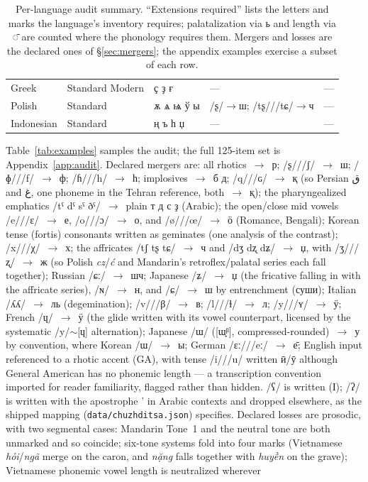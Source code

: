 \documentclass[12pt]{article}
\newcommand{\cz}[1]{{\chu #1}}
\newcommand{\ph}[1]{{\ipafont/#1/}}
\begin{document}
\begin{table}[ht]
\begin{tabular}{lllll}
Greek & Standard Modern & \cz{ҫ ҙ ғ} & — & — \\
Polish & Standard & \cz{ѫ ѧ ѩ ў ы} & \ph{ʂ}$\rightarrow$\cz{ш}; \ph{tʂ}/\ph{tɕ}$\rightarrow$\cz{ч} & — \\
Indonesian & Standard & \cz{ң ъ һ џ} & — & — \\
\bottomrule
\end{tabular}
\caption{Per-language audit summary. ``Extensions required'' lists the letters and marks the language's inventory requires; palatalization via \cz{ь} and length via \cz{◌̄} are counted where the phonology requires them. Mergers and losses are the declared ones of \S\ref{sec:mergers}; the appendix examples exercise a subset of each row.}
\label{tab:audit}
\end{table}
 Table~\ref{tab:examples} samples the audit; the full 125-item set is Appendix~\ref{app:audit}. Declared mergers\label{sec:mergers} are: all rhotics~$\rightarrow$~\cz{р}; \ph{ʂ}/\ph{ʃ}~$\rightarrow$~\cz{ш}; \ph{ɸ}/\ph{f}~$\rightarrow$~\cz{ф}; \ph{ɦ}/\ph{h}~$\rightarrow$~\cz{һ}; implosives~$\rightarrow$~\cz{б д}; \ph{q}/\ph{ɢ}~$\rightarrow$~\cz{қ} (so Persian {\ipafont ق} and {\ipafont غ}, one phoneme in the Tehran reference, both~$\rightarrow$~\cz{қ}); the pharyngealized emphatics \ph{tˤ dˤ sˤ ðˤ}~$\rightarrow$~plain \cz{т д с ҙ} (Arabic); the open/close mid vowels \ph{e}/\ph{ɛ}~$\rightarrow$~\cz{е}, \ph{o}/\ph{ɔ}~$\rightarrow$~\cz{о}, and \ph{ø}/\ph{œ}~$\rightarrow$~\cz{ӧ} (Romance, Bengali); Korean tense (fortis) consonants written as geminates (one analysis of the contrast); \ph{x}/\ph{χ}~$\rightarrow$~\cz{х}; the affricates \ph{tʃ tʂ tɕ}~$\rightarrow$~\cz{ч} and \ph{dʒ dʐ dʑ}~$\rightarrow$~\cz{џ}, with \ph{ʒ}/\ph{ʐ}~$\rightarrow$~\cz{ж} (so Polish \emph{cz}/\emph{ć} and Mandarin's retroflex/palatal series each fall together); Russian \ph{ɕː}~$\rightarrow$~\cz{шч}; Japanese \ph{ʑ}~$\rightarrow$~\cz{џ} (the fricative falling in with the affricate series), \ph{ɴ}~$\rightarrow$~\cz{н}, and \ph{ɕ}~$\rightarrow$~\cz{ш} by entrenchment (\cz{суши}); Italian \ph{ʎʎ}~$\rightarrow$~\cz{ль} (degemination); \ph{v}/\ph{β}~$\rightarrow$~\cz{в}; \ph{l}/\ph{ɫ}~$\rightarrow$~\cz{л}; \ph{y}/\ph{ʏ}~$\rightarrow$~\cz{ӱ}; French \ph{ɥ}~$\rightarrow$~\cz{ӱ} (the glide written with its vowel counterpart, licensed by the systematic \ph{y}$\sim$[ɥ] alternation); Japanese \ph{ɯ} ([ɯ̟ᵝ], compressed-rounded)~$\rightarrow$~\cz{у} by convention, where Korean \ph{ɯ}~$\rightarrow$~\cz{ы}; German \ph{ɛː}/\ph{eː}~$\rightarrow$~\cz{е̄}; English input referenced to a rhotic accent (GA), with tense \ph{i}/\ph{u} written \cz{ӣ}/\cz{ӯ} although General American has no phonemic length — a transcription convention imported for reader familiarity, flagged rather than hidden. \ph{ʕ} is written (\cz{Ӏ}); \ph{ʔ} is written with the apostrophe \cz{’} in Arabic contexts and dropped elsewhere, as the shipped mapping (\texttt{data/chuzhditsa.json}) specifies. Declared losses are prosodic, with two segmental cases: Mandarin Tone~1 and the neutral tone are both unmarked and so coincide; six-tone systems fold into four marks (Vietnamese \emph{hỏi}/\emph{ngã} merge on the caron, and \emph{nặng} falls together with \emph{huyền} on the grave); Vietnamese phonemic vowel length is neutralized wherever 
\end{document}
